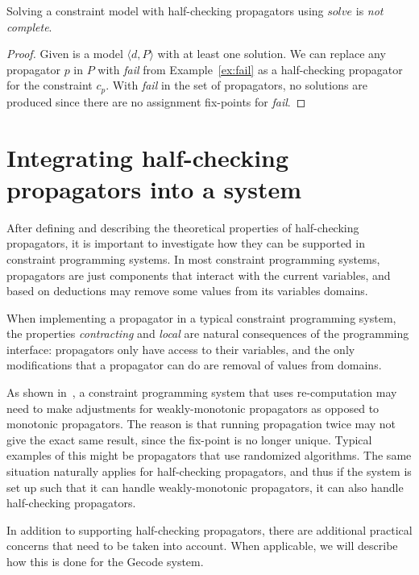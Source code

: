 \documentclass[runningheads]{llncs}
\begin{document}
\begin{theorem}
  Solving a constraint model with half-checking propagators using
  $solve$ is \emph{not complete}.
\end{theorem}
\begin{proof}
  Given is a model $\langle d, P\rangle$ with at least one
  solution. We can replace any propagator $p$ in $P$ with \emph{fail}
  from Example~\ref{ex:fail} as a half-checking propagator for the
  constraint $c_p$. With \emph{fail} in the set of propagators, no
  solutions are produced since there are no assignment fix-points for
  \emph{fail}.
\end{proof}


\section{Integrating half-checking propagators into a system}
\label{sec:integration}

After defining and describing the theoretical properties of
half-checking propagators, it is important to investigate how they can
be supported in constraint programming systems.  In most constraint
programming systems, propagators are just components that interact
with the current variables, and based on deductions may remove some
values from its variables domains. 

When implementing a propagator in a typical constraint programming system,
the properties \emph{contracting} and \emph{local}  are natural
consequences of the programming interface: propagators only have
access to their variables, and the only modifications that a
propagator can do are removal of values from domains.

As shown in~\cite{SchulteTack:CP:2009}, a constraint programming
system that uses re-computation may need to make adjustments for
weakly-monotonic propagators as opposed to monotonic propagators. The
reason is that running propagation twice may not give the exact same
result, since the fix-point is no longer unique. Typical examples of
this might be propagators that use randomized algorithms. The same situation
naturally applies for half-checking propagators, and thus if the
system is set up such that it can handle weakly-monotonic propagators,
it can also handle half-checking propagators.

In addition to supporting half-checking propagators, there are
additional practical concerns that need to be taken into account. When
applicable, we will describe how this is done for the Gecode system.
\end{document}
